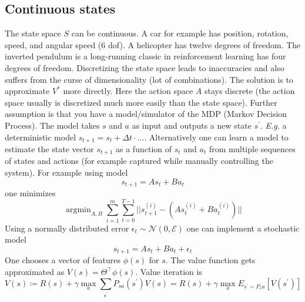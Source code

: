 \documentclass{article}
\begin{document}
\subsection{Continuous states}
The state space $S$ can be continuous.
A car for example has position, rotation, speed, and angular speed (6 dof).
A helicopter has twelve degrees of freedom.
The inverted pendulum is a long-running classic in reinforcement learning has four degrees of freedom.
Discretizing the state space leads to inaccuracies and also suffers from the curse of dimensionality (lot of combinations).
The solution is to approximate $V^\ast$ more directly.
Here the action space $A$ stays discrete (the action space usually is discretized much more easily than the state space).
Further assumption is that you have a model/simulator of the MDP (Markov Decision Process).
The model takes $s$ and $a$ as input and outputs a new state $s^\prime$.
\emph{E.g.} a deterministic model $s_{t+1}=s_t+\Delta t\cdot\ldots$.
Alternatively one can learn a model to estimate the state vector $s_{t+1}$ as a function of $s_t$ and $a_t$
from multiple sequences of states and actions (for example captured while manually controlling the system).
For example using model
\begin{equation}
  s_{t+1}=As_t+Ba_t
\end{equation}
one minimizes
\begin{equation}
  \mathop{\operatorname{argmin}}_{A,B}\sum_{i=1}^m\sum_{t=0}^{T-1}||s^{(i)}_{t+1}-(As^{(i)}_t+Ba^{(i)}_t)||
\end{equation}
Using a normally distributed error $\epsilon_t\sim\mathcal{N}(0,\mathcal{E})$ one can implement a stochastic model
\begin{equation}
  s_{t+1}=As_t+Ba_t+\epsilon_t
\end{equation}
One chooses a vector of features $\phi(s)$ for $s$.
The value function gets approximated as $V(s)=\Theta^\top\phi(s)$.
Value iteration is
\begin{equation}
  V(s)\coloneqq R(s)+\gamma\max_a\sum_{s^\prime}P_{sa}(s^\prime)V(s)=
  R(s)+\gamma\max_a E_{s^\prime\sim P_sa}[V(s^\prime)]
\end{equation}
\end{document}
